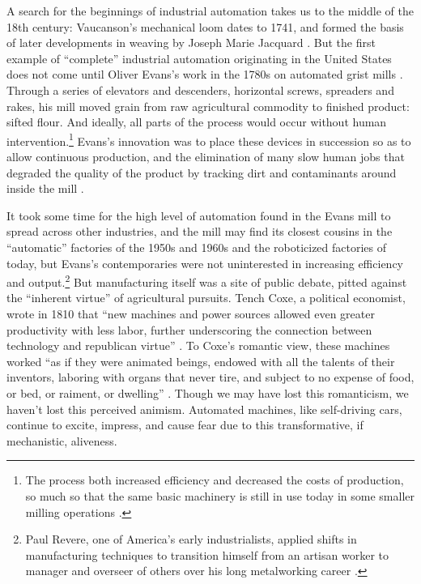 A search for the beginnings of industrial automation takes us to the middle of
the 18th century: Vaucanson's mechanical loom dates to 1741, and formed the basis of
 later developments in weaving by Joseph Marie Jacquard \cite[p. 9]{dieboldImpact}. 
But the first example of ``complete'' industrial automation originating in the
United States does not come until Oliver Evans's work in the 1780s on
automated grist mills \cite[p. 5]{roesmithYankee}. Through a series of elevators and descenders,
horizontal screws, spreaders and rakes, his mill moved grain from raw
agricultural commodity to finished product: sifted flour. And ideally,
all parts of the process would occur without human
intervention.\footnote{The process both increased efficiency and
  decreased the costs 
of production, so much so that the same basic machinery is still in
use today in some smaller milling operations \cite{wyegrist}.}
Evans's innovation was to place these devices 
in succession so as to allow continuous production, and the
elimination of many slow human jobs that degraded the quality of the
product by tracking dirt and contaminants around inside the
mill \cite[p. 203]{evansMillguide}. 

It took some time for the high level of automation found in the Evans
mill to spread across other industries, and the mill may find its
closest cousins in the ``automatic'' factories of the 1950s and 1960s
and the roboticized factories of today, but Evans's contemporaries
were not uninterested in increasing efficiency and output.\footnote{Paul
Revere, one of America's early industrialists, applied shifts in
manufacturing techniques to transition himself from an
artisan worker to manager and overseer of others over his long
metalworking career \cite[p. 187]{martello}.} But manufacturing itself was a site of public
debate, pitted against the ``inherent virtue'' of agricultural pursuits.
Tench Coxe, a political economist, wrote in 1810 that ``new machines
and power sources allowed even greater productivity with less labor,
further underscoring the connection between technology and republican
virtue'' \cite[p. 217]{martello}. To Coxe's romantic view, these machines  worked ``as if they
were animated beings, endowed with all the talents of their inventors,
laboring with organs that never tire, and subject to no expense of
food, or bed, or raiment, or dwelling'' \cite[p. xxv]{coxe}. Though we
may have lost this romanticism, we haven't lost this perceived
animism. Automated machines, like self-driving cars, continue to
excite, impress, and cause fear due to this transformative, if
mechanistic, aliveness.

